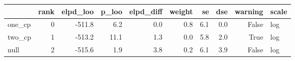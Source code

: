 \begin{tabular}{lrrrrrrrrl}
\toprule
 & rank & elpd_loo & p_loo & elpd_diff & weight & se & dse & warning & scale \\
\midrule
one_cp & 0 & -511.8 & 6.2 & 0.0 & 0.8 & 6.1 & 0.0 & False & log \\
two_cp & 1 & -513.2 & 11.1 & 1.3 & 0.0 & 5.8 & 2.0 & True & log \\
null & 2 & -515.6 & 1.9 & 3.8 & 0.2 & 6.1 & 3.9 & False & log \\
\bottomrule
\end{tabular}
